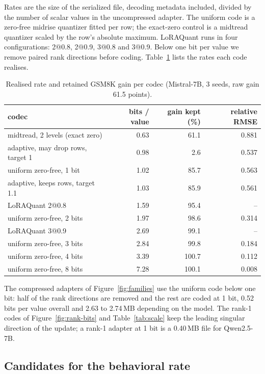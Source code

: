 Rates are the size of the serialized file, decoding metadata included, divided by the number of scalar values in the uncompressed adapter. The uniform code is a zero-free midrise quantizer fitted per row; the exact-zero control is a midtread quantizer scaled by the row's absolute maximum. LoRAQuant runs in four configurations: 2@0.8, 2@0.9, 3@0.8 and 3@0.9. Below one bit per value we remove paired rank directions before coding. Table~\ref{tab:codecs} lists the rates each code realises.

\begin{table}[h]
\caption{Realised rate and retained GSM8K gain per codec (Mistral-7B, 3 seeds, raw gain 61.5 points).}
\label{tab:codecs}
\centering
\small
\begin{tabular}{lrrr}
\toprule
codec & bits / value & gain kept (\%) & relative RMSE \\
\midrule
midtread, 2 levels (exact zero) & 0.63 & 61.1 & 0.881 \\
adaptive, may drop rows, target 1 & 0.98 & 2.6 & 0.537 \\
uniform zero-free, 1 bit & 1.02 & 85.7 & 0.563 \\
adaptive, keeps rows, target 1.1 & 1.03 & 85.9 & 0.561 \\
LoRAQuant 2@0.8 & 1.59 & 95.4 & -- \\
uniform zero-free, 2 bits & 1.97 & 98.6 & 0.314 \\
LoRAQuant 3@0.9 & 2.69 & 99.1 & -- \\
uniform zero-free, 3 bits & 2.84 & 99.8 & 0.184 \\
uniform zero-free, 4 bits & 3.39 & 100.7 & 0.112 \\
uniform zero-free, 8 bits & 7.28 & 100.1 & 0.008 \\
\bottomrule
\end{tabular}
\end{table}

The compressed adapters of Figure~\ref{fig:families} use the uniform code below one bit: half of the rank directions are removed and the rest are coded at 1 bit, 0.52 bits per value overall and 2.63 to 2.74\,MB depending on the model. The rank-1 codes of Figure~\ref{fig:rank-bits} and Table~\ref{tab:scale} keep the leading singular direction of the update; a rank-1 adapter at 1 bit is a 0.40\,MB file for Qwen2.5-7B.

\subsection{Candidates for the behavioral rate}
\label{app:negative}

